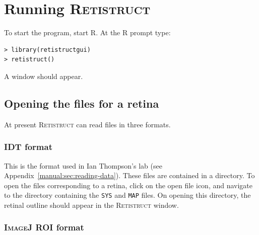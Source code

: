 \documentclass{article}
\begin{document}
\section{Running \textsc{Retistruct}}
\label{manual:sec:running}

To start the program, start \textsc{R}. At the \textsc{R} prompt type:

\begin{verbatim}
> library(retistructgui)
> retistruct()
\end{verbatim}
A window should appear.

\subsection{Opening the files for a retina}
\label{manual:sec:opening-files-retina}

At present \textsc{Retistruct} can read files in three formats.

\subsubsection{IDT format}
\label{retistruct-manual:sec:idt-format}

This is the format used in Ian Thompson's lab (see
Appendix~\ref{manual:sec:reading-data}). These files are contained in
a directory. To open the files corresponding to a retina, click on the
open file icon, and navigate to the directory containing the
\texttt{SYS} and \texttt{MAP} files. On opening this directory, the
retinal outline should appear in the \textsc{Retistruct} window.

\subsubsection{\textsc{ImageJ} ROI format}
\label{retistruct-manual:sec:ijroi-format}
\end{document}
